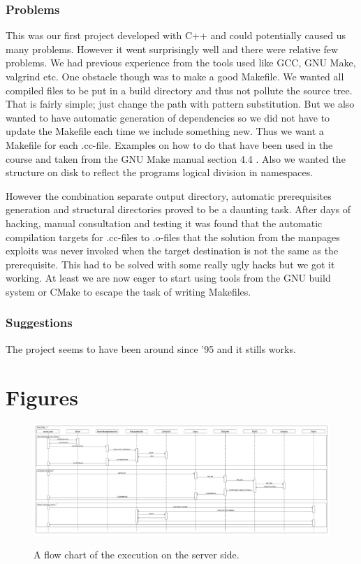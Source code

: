 \documentclass[10pt, a4paper]{article}
\begin{document}
\subsubsection{Problems}
This was our first project developed with C++ and could potentially caused us many problems. However it went surprisingly well and there were relative few problems. We had previous experience from the tools used like GCC, GNU Make, valgrind etc. One obstacle though was to make a good Makefile. We wanted all compiled files to be put in a build directory and thus not pollute the source tree. That is fairly simple; just change the path with pattern substitution. But we also wanted to have automatic generation of dependencies so we did not have to update the Makefile each time we include something new. Thus we want a Makefile for each .cc-file. Examples on how to do that have been used in the course and taken from the GNU Make manual section 4.4 \cite{makeman}. Also we wanted the structure on disk to reflect the programs logical division in namespaces.

However the combination separate output directory, automatic prerequisites generation and structural directories proved to be a daunting task. After days of hacking, manual consultation and testing it was found that the automatic compilation targets for .cc-files to .o-files that the solution from the manpages exploits was never invoked when the target destination is not the same as the prerequisite. This had to be solved with some really ugly hacks but we got it working. At least we are now eager to start using tools from the GNU build system or CMake to escape the task of writing Makefiles.

\subsubsection{Suggestions}
The project seems to have been around since '95 and it stills works.

\appendix



\section{Figures}
\begin{figure}[hbt]
\begin{center}
\vspace*{-1.8in}
\label{flow+chart}
\includegraphics[scale=0.3,angle=90]{img/flow-chart.pdf}
\thispagestyle{empty}	%
\end{center}
\caption{A flow chart of the execution on the server side.}
\end{figure}
\end{document}
